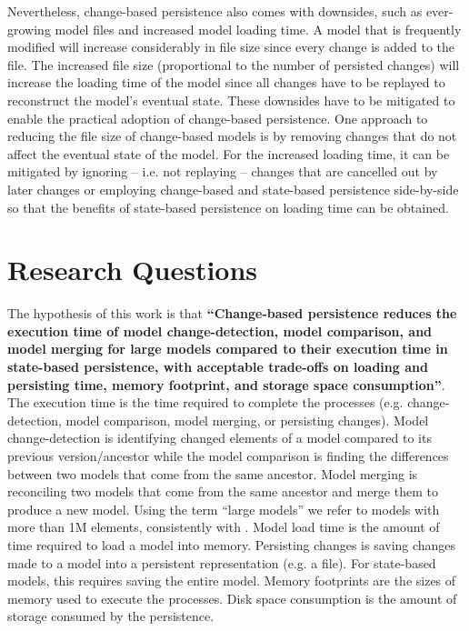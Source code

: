 \documentclass[12pt, a4paper]{report} \usepackage[titletoc]{appendix}
\begin{document}
Nevertheless, change-based persistence also comes with downsides, such as ever-growing model files and increased model loading time. A model that is frequently modified will increase considerably in file size since every change is added to the file. The increased file size (proportional to the number of persisted changes) will increase the loading time of the model since all changes have to be replayed to reconstruct the model's eventual state. These downsides have to be mitigated to enable the practical adoption of change-based persistence. One approach to reducing the file size of change-based models is by removing changes that do not affect the eventual state of the model. For the increased loading time, it can be mitigated by ignoring -- i.e. not replaying -- changes that are cancelled out by later changes or employing change-based and state-based persistence side-by-side so that the benefits of state-based persistence on loading time can be obtained.   

\section{Research Questions}
\label{sec:research_questions}
The hypothesis of this work is that \textbf{``Change-based persistence reduces the execution time of model change-detection, model comparison, and model merging for large models compared to their execution time in state-based persistence, with acceptable trade-offs on loading and persisting time, memory footprint, and storage space consumption''}. The execution time is the time required to complete the processes (e.g. change-detection, model comparison, model merging, or persisting changes). Model change-detection is identifying changed elements of a model compared to its previous version/ancestor while the model comparison is finding the differences between two models that come from the same ancestor. Model merging is reconciling two models that come from the same ancestor and merge them to produce a new model. Using the term ``large models'' we refer to models with more than 1M elements, consistently with \cite{daniel2016neoemf,pagan2011morsa}. Model load time is the amount of time required to load a model into memory. Persisting changes is saving changes made to a model into a persistent representation (e.g. a file). For state-based models, this requires saving the entire model. Memory footprints are the sizes of memory used to execute the processes. Disk space consumption is the amount of storage consumed by the persistence.  
\end{document}
